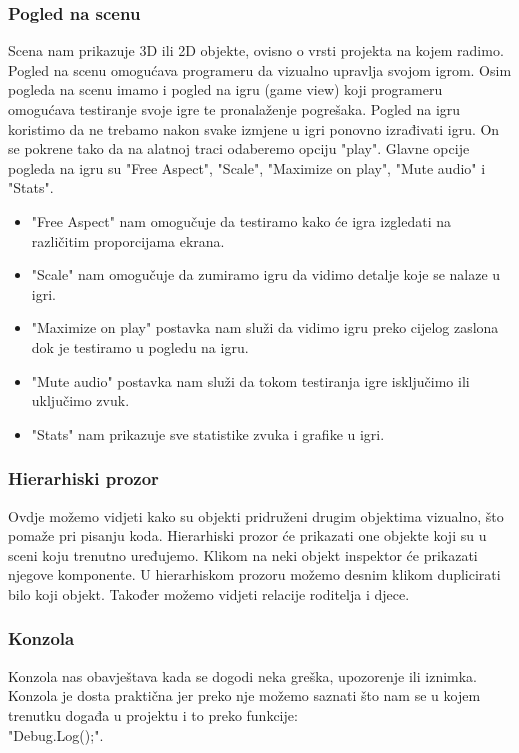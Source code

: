 \subsubsection{Pogled na scenu}
Scena nam prikazuje 3D ili 2D objekte, ovisno o vrsti projekta na kojem radimo. Pogled na scenu omogućava programeru da vizualno upravlja svojom igrom. Osim pogleda na scenu imamo i pogled na igru (game view) koji programeru omogućava testiranje svoje igre te pronalaženje pogrešaka. Pogled na igru koristimo da ne trebamo nakon svake izmjene u igri ponovno izrađivati igru. On se pokrene tako da na alatnoj traci odaberemo opciju "play". Glavne opcije pogleda na igru su "Free Aspect", "Scale", "Maximize on play", "Mute audio" i "Stats". 
\begin{itemize}
	\item "Free Aspect" nam omogučuje da testiramo kako će igra izgledati na različitim proporcijama ekrana. 
	
	\item "Scale" nam omogučuje da zumiramo igru da vidimo detalje koje se nalaze u igri.
	
	\item "Maximize on play" postavka nam služi da vidimo igru preko cijelog zaslona dok je testiramo u pogledu na igru.
	
	\item "Mute audio" postavka nam služi da tokom testiranja igre isključimo ili uključimo zvuk.
	
	\item "Stats" nam prikazuje sve statistike zvuka i grafike u igri.
	
\end{itemize}


\subsubsection{Hierarhiski prozor}
Ovdje možemo vidjeti kako su objekti pridruženi drugim objektima vizualno, što pomaže pri pisanju koda. Hierarhiski prozor će prikazati one objekte koji su u sceni koju trenutno uređujemo. Klikom na neki objekt inspektor će prikazati njegove komponente. U hierarhiskom prozoru možemo desnim klikom duplicirati bilo koji objekt. Također možemo vidjeti relacije roditelja i djece.

\subsubsection{Konzola}
Konzola nas obavještava kada se dogodi neka greška, upozorenje ili iznimka. Konzola je dosta praktična jer  preko nje možemo saznati što nam se u kojem trenutku događa u projektu i to preko funkcije:\\ "Debug.Log();". 

